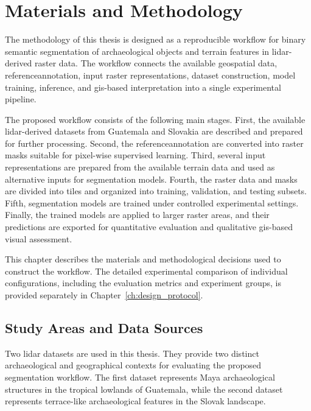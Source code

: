 
\chapter{Materials and Methodology}\label{ch:methodology}

The methodology of this thesis is designed as a reproducible workflow for binary semantic segmentation of archaeological objects and terrain features in \gls{lidar}-derived raster data. The workflow connects the available geospatial data, \gls{referenceannotation}, input raster representations, dataset construction, model training, inference, and \gls{gis}-based interpretation into a single experimental pipeline.

The proposed workflow consists of the following main stages. First, the available \gls{lidar}-derived datasets from Guatemala and Slovakia are described and prepared for further processing. Second, the \gls{referenceannotation} are converted into raster masks suitable for pixel-wise supervised learning. Third, several input representations are prepared from the available terrain data and used as alternative inputs for segmentation models. Fourth, the raster data and masks are divided into tiles and organized into training, validation, and testing subsets. Fifth, segmentation models are trained under controlled experimental settings. Finally, the trained models are applied to larger raster areas, and their predictions are exported for quantitative evaluation and qualitative \gls{gis}-based visual assessment.

This chapter describes the materials and methodological decisions used to construct the workflow. The detailed experimental comparison of individual configurations, including the evaluation metrics and experiment groups, is provided separately in Chapter~\ref{ch:design_protocol}.

\section{Study Areas and Data Sources}

Two \gls{lidar} datasets are used in this thesis. They provide two distinct archaeological and geographical contexts for evaluating the proposed segmentation workflow. The first dataset represents Maya archaeological structures in the tropical lowlands of Guatemala, while the second dataset represents terrace-like archaeological features in the Slovak landscape.

